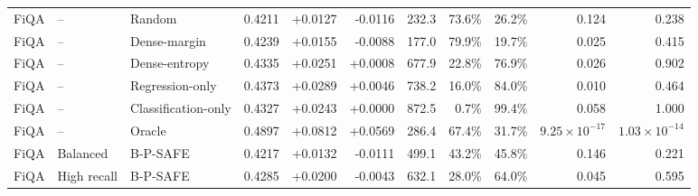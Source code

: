 \begin{table}[!htbp]
\begin{tabular}{lllrrrrrrrr}
FiQA & -- & Random & 0.4211 & +0.0127 & -0.0116 & 232.3 & 73.6\% & 26.2\% & 0.124 & 0.238 \\
FiQA & -- & Dense-margin & 0.4239 & +0.0155 & -0.0088 & 177.0 & 79.9\% & 19.7\% & 0.025 & 0.415 \\
FiQA & -- & Dense-entropy & 0.4335 & +0.0251 & +0.0008 & 677.9 & 22.8\% & 76.9\% & 0.026 & 0.902 \\
FiQA & -- & Regression-only & 0.4373 & +0.0289 & +0.0046 & 738.2 & 16.0\% & 84.0\% & 0.010 & 0.464 \\
FiQA & -- & Classification-only & 0.4327 & +0.0243 & +0.0000 & 872.5 & 0.7\% & 99.4\% & 0.058 & 1.000 \\
FiQA & -- & Oracle & 0.4897 & +0.0812 & +0.0569 & 286.4 & 67.4\% & 31.7\% & $9.25\!\times\!10^{-17}$ & $1.03\!\times\!10^{-14}$ \\
FiQA & Balanced & B-P-SAFE & 0.4217 & +0.0132 & -0.0111 & 499.1 & 43.2\% & 45.8\% & 0.146 & 0.221 \\
FiQA & High recall & B-P-SAFE & 0.4285 & +0.0200 & -0.0043 & 632.1 & 28.0\% & 64.0\% & 0.045 & 0.595 \\
\bottomrule
\end{tabular}
\end{table}
